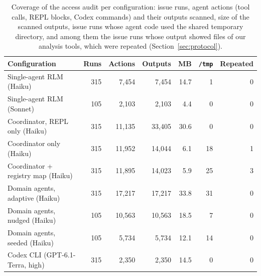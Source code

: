 \begin{table}[t]
\centering
\caption{Coverage of the access audit per configuration: issue runs, agent actions (tool calls, REPL blocks, Codex commands) and their outputs scanned, size of the scanned outputs, issue runs whose agent code used the shared temporary directory, and among them the issue runs whose output showed files of our analysis tools, which were repeated (Section~\ref{sec:protocol}).}
\label{tab:audit}
\scriptsize
\begin{tabular}{lrrrrrr}
\toprule
Configuration & Runs & Actions & Outputs & MB & \texttt{/tmp} & Repeated \\
\midrule
Single-agent RLM (Haiku) & 315 & 7{,}454 & 7{,}454 & 14.7 & 1 & 0 \\
Single-agent RLM (Sonnet) & 105 & 2{,}103 & 2{,}103 & 4.4 & 0 & 0 \\
Coordinator, REPL only (Haiku) & 315 & 11{,}135 & 33{,}405 & 30.6 & 0 & 0 \\
Coordinator only (Haiku) & 315 & 11{,}952 & 14{,}044 & 6.1 & 18 & 1 \\
Coordinator + registry map (Haiku) & 315 & 11{,}895 & 14{,}023 & 5.9 & 25 & 3 \\
Domain agents, adaptive (Haiku) & 315 & 17{,}217 & 17{,}217 & 33.8 & 31 & 0 \\
Domain agents, nudged (Haiku) & 105 & 10{,}563 & 10{,}563 & 18.5 & 7 & 0 \\
Domain agents, seeded (Haiku) & 105 & 5{,}734 & 5{,}734 & 12.1 & 14 & 0 \\
Codex CLI (GPT-6.1-Terra, high) & 315 & 2{,}350 & 2{,}350 & 14.5 & 0 & 0 \\
\bottomrule
\end{tabular}
\end{table}
